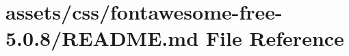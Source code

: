 \hypertarget{css_2fontawesome-free-5_80_88_2_r_e_a_d_m_e_8md}{}\section{assets/css/fontawesome-\/free-\/5.0.8/\+R\+E\+A\+D\+ME.md File Reference}
\label{css_2fontawesome-free-5_80_88_2_r_e_a_d_m_e_8md}
